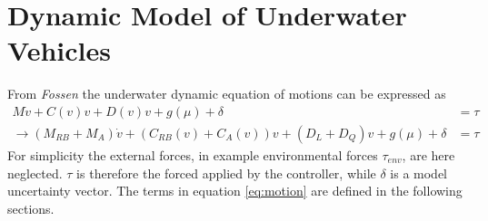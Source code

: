 \section{Dynamic Model of Underwater Vehicles}
From \textit{Fossen} \cite{Fossen} the underwater dynamic equation of motions can be expressed as
\begin{align}
    M\Dot{v}+C(v)v+D(v)v+g(\mu)+\delta & = \tau \\
    \longrightarrow (M_{RB}+M_{A})\Dot{v}+(C_{RB}(v)+C_{A}(v))v+(D_{L}+D_{Q})v + g(\mu)+\delta & = \tau 
    \label{eq:motion}
\end{align}
For simplicity the external forces, in example environmental forces $\tau_{env}$, are here neglected. $\tau$ is therefore the forced applied by the controller, while $\delta$ is a model uncertainty vector. The terms in equation \ref{eq:motion} are defined in the following sections.
